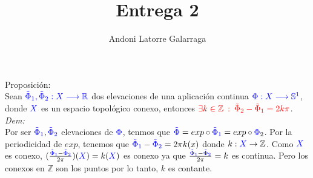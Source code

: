 \documentclass{article}
\title{Entrega 2}
\author{Andoni Latorre Galarraga}
\date{}
\newcommand{\bb}[1]{\mathbb{#1}}
\begin{document}
\maketitle
\textcolor{WildStrawberry}{Proposición:}\\
Sean $\textcolor{blue}{\tilde{\Phi}_1, \tilde{\Phi}_2:X\longrightarrow \bb{R}}$ dos elevaciones de una aplicación continua $\textcolor{blue}{\Phi: X \longrightarrow \bb{S}^1}$, donde $\textcolor{blue}{X}$ es un espacio topológico conexo, entonces $\textcolor{red}{\exists k\in \bb{Z} \: :\: \tilde{\Phi}_2-\tilde{\Phi}_1 = 2k\pi}$.\\

\textcolor{WildStrawberry}{\textit{Dem:}}\\
Por ser $\textcolor{blue}{\tilde{\Phi}_1},\textcolor{blue}{\tilde{\Phi}_2}$ elevaciones de $\textcolor{blue}{\Phi}$, tenmos que $\textcolor{blue}{\tilde{\Phi}} = exp \circ \textcolor{blue}{\tilde{\Phi}_1} = exp \circ \textcolor{blue}{\Phi}_2$. Por la periodicidad de $exp$, tenemos que $\textcolor{blue}{\tilde{\Phi}_1} - \textcolor{blue}{\tilde{\Phi}_2} = 2\pi k(x)$ donde $k:\textcolor{blue}{X}\rightarrow \bb{Z}$. Como $\textcolor{blue}{X}$ es conexo, $(\frac{\textcolor{blue}{\tilde{\Phi}_1}- \textcolor{blue}{\tilde{\Phi}_2}}{2\pi})(\textcolor{blue}{X})=k(\textcolor{blue}{X})$ es conexo ya que $\frac{\textcolor{blue}{\tilde{\Phi}_1}- \textcolor{blue}{\tilde{\Phi}_2}}{2\pi}=k$ es continua. Pero los conexos en $\bb{Z}$ son los puntos por lo tanto, $k$ es contante.
\end{document}
